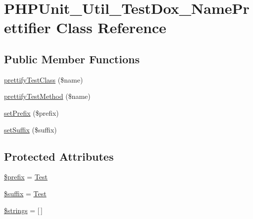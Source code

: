 \hypertarget{class_p_h_p_unit___util___test_dox___name_prettifier}{}\section{P\+H\+P\+Unit\+\_\+\+Util\+\_\+\+Test\+Dox\+\_\+\+Name\+Prettifier Class Reference}
\label{class_p_h_p_unit___util___test_dox___name_prettifier}
\subsection*{Public Member Functions}
\begin{DoxyCompactItemize}
\item 
\mbox{\hyperlink{class_p_h_p_unit___util___test_dox___name_prettifier_a255e7e4315048c61b2f36ca49cdf141c}{prettify\+Test\+Class}} (\$name)
\item 
\mbox{\hyperlink{class_p_h_p_unit___util___test_dox___name_prettifier_ad22d93673027553a4a2d3629ce80b32b}{prettify\+Test\+Method}} (\$name)
\item 
\mbox{\hyperlink{class_p_h_p_unit___util___test_dox___name_prettifier_a523b9bda674fc27df98f0da0b3f3276c}{set\+Prefix}} (\$prefix)
\item 
\mbox{\hyperlink{class_p_h_p_unit___util___test_dox___name_prettifier_a8b66b44d0135bdf7105bf969d638fabe}{set\+Suffix}} (\$suffix)
\end{DoxyCompactItemize}
\subsection*{Protected Attributes}
\begin{DoxyCompactItemize}
\item 
\mbox{\hyperlink{class_p_h_p_unit___util___test_dox___name_prettifier_a09e8cf95b9d29955a0bfabca9b420edc}{\$prefix}} = \textquotesingle{}\mbox{\hyperlink{class_test}{Test}}\textquotesingle{}
\item 
\mbox{\hyperlink{class_p_h_p_unit___util___test_dox___name_prettifier_a8a4ee1ac7ecdf8ef590598ad43b23e0a}{\$suffix}} = \textquotesingle{}\mbox{\hyperlink{class_test}{Test}}\textquotesingle{}
\item 
\mbox{\hyperlink{class_p_h_p_unit___util___test_dox___name_prettifier_aa5b5c2d571df2c930c127078012a01fc}{\$strings}} = \mbox{[}$\,$\mbox{]}
\end{DoxyCompactItemize}


